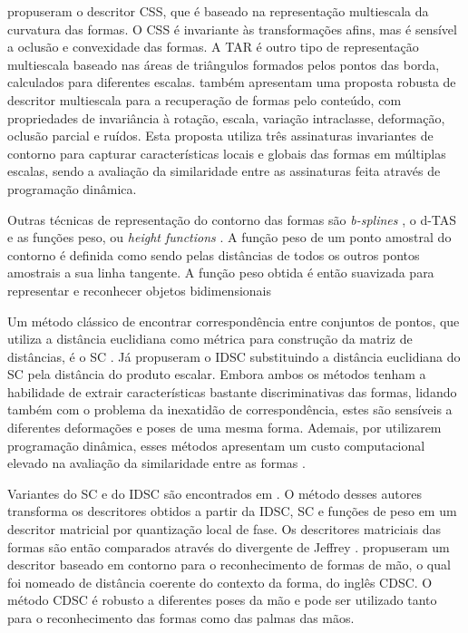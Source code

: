  propuseram o descritor \ac{CSS}, que é baseado na representação multiescala da curvatura das formas. O \ac{CSS} é invariante às transformações afins, mas é sensível a oclusão e convexidade das formas. A \ac{TAR} \cite{Alajlan20117} é outro tipo de representação multiescala baseado nas áreas de triângulos formados pelos pontos das borda, calculados para diferentes escalas. 
 também apresentam uma proposta robusta de descritor multiescala para a recuperação de formas pelo conteúdo, com propriedades de invariância à rotação, escala, variação intraclasse, deformação,  oclusão parcial e ruídos. Esta proposta utiliza três assinaturas invariantes de contorno para capturar características locais e globais das formas em múltiplas escalas, sendo a avaliação da similaridade entre as assinaturas feita através de programação dinâmica.



Outras técnicas de representação do contorno das formas são \textit{b-splines} \cite{1168520}, o \ac{d-TAS} \cite{4202050} e as funções peso, ou \textit{height functions} \cite{Wang2012134}. A função peso de um ponto amostral do contorno é definida como sendo pelas distâncias de todos os outros pontos amostrais a sua linha tangente. A função peso obtida é então suavizada para representar e reconhecer objetos bidimensionais

Um método clássico de encontrar correspondência entre conjuntos de pontos, que utiliza a distância euclidiana como métrica para construção da matriz de distâncias, é o \ac{SC} \cite{Belongie:2002}. Já  propuseram o \ac{IDSC} substituindo a distância euclidiana do \ac{SC} pela distância do produto escalar. Embora ambos os métodos tenham a habilidade de extrair características bastante discriminativas das formas, lidando também com o problema da inexatidão de correspondência, estes são sensíveis a diferentes deformações e poses de uma mesma forma. Ademais, por utilizarem programação dinâmica, esses métodos apresentam um custo computacional elevado na avaliação da similaridade entre as formas \cite{FreitasS.TorresMiranda2016}.

Variantes do \ac{SC} e do \ac{IDSC} são encontrados em . O método desses autores transforma os descritores obtidos a partir da \ac{IDSC}, \ac{SC} e funções de peso em um descritor matricial por quantização local de fase. Os descritores matriciais das formas são então comparados através do divergente de Jeffrey \cite{Ullah1996}.  propuseram um descritor baseado em contorno para o reconhecimento de formas de mão, o qual foi nomeado de distância coerente do contexto da forma, do inglês \ac{CDSC}. O método \ac{CDSC} é robusto a diferentes poses da mão e pode ser utilizado tanto para o reconhecimento das formas como das palmas das mãos.  

